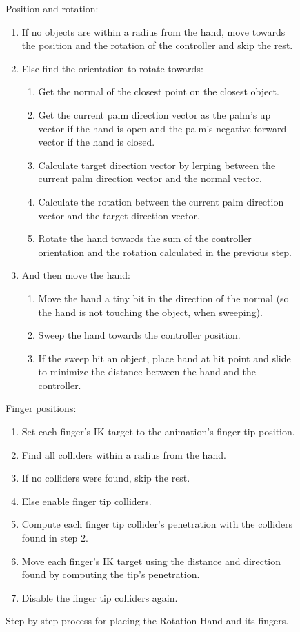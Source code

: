 \begin{figure}[H]
\footnotesize
Position and rotation:
\begin{enumerate}[noitemsep]
\item If no objects are within a radius from the hand, move towards the position and the rotation of the controller and skip the rest.
\item Else find the orientation to rotate towards:
\begin{enumerate}[noitemsep]
\item Get the normal of the closest point on the closest object.
\item Get the current palm direction vector as the palm's up vector if the hand is open and the palm's negative forward vector if the hand is closed.
\item Calculate target direction vector by lerping between the current palm direction vector and the normal vector.
\item Calculate the rotation between the current palm direction vector and the target direction vector.
\item Rotate the hand towards the sum of the controller orientation and the rotation calculated in the previous step.
\end{enumerate}
\item And then move the hand:
\begin{enumerate}[noitemsep]
\item Move the hand a tiny bit in the direction of the normal (so the hand is not touching the object, when sweeping).
\item Sweep the hand towards the controller position.
\item If the sweep hit an object, place hand at hit point and slide to minimize the distance between the hand and the controller.
\end{enumerate}
\end{enumerate}
Finger positions:
\begin{enumerate}[noitemsep]
\item Set each finger's IK target to the animation's finger tip position.
\item Find all colliders within a radius from the hand.
\item If no colliders were found, skip the rest.
\item Else enable finger tip colliders.
\item Compute each finger tip collider's penetration with the colliders found in step 2.
\item Move each finger's IK target using the distance and direction found by computing the tip's penetration.
\item Disable the finger tip colliders again.
\end{enumerate}
\caption{Step-by-step process for placing the Rotation Hand and its fingers.}
\label{fig:stepByStepRotationHand}
\end{figure}

